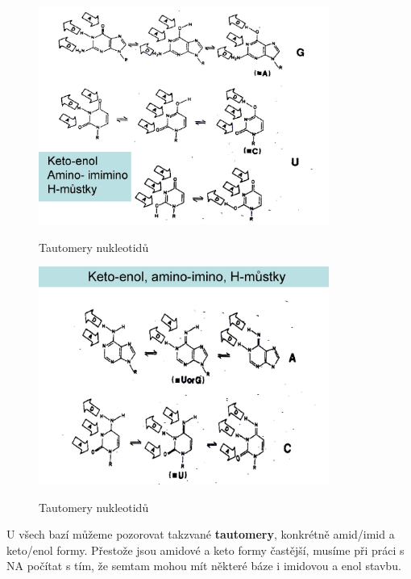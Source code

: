 \documentclass[DIV=8]{scrreprt}
\begin{document}
\begin{figure}
    \caption{Tautomery nukleotidů}
    \includegraphics[width=0.85\textwidth]{slides-3/slide-47.jpg}
    \centering
    \label{}
\end{figure}

\begin{figure}
    \caption{Tautomery nukleotidů}
    \includegraphics[width=0.85\textwidth]{slides-3/slide-48.jpg}
    \centering
    \label{}
\end{figure}


U všech bazí můžeme pozorovat takzvané \textbf{tautomery}, konkrétně amid/imid a keto/enol formy. Přestože jsou amidové a keto formy častější, musíme při práci s NA počítat s tím, že semtam mohou mít některé báze i imidovou a enol stavbu.
\end{document}
